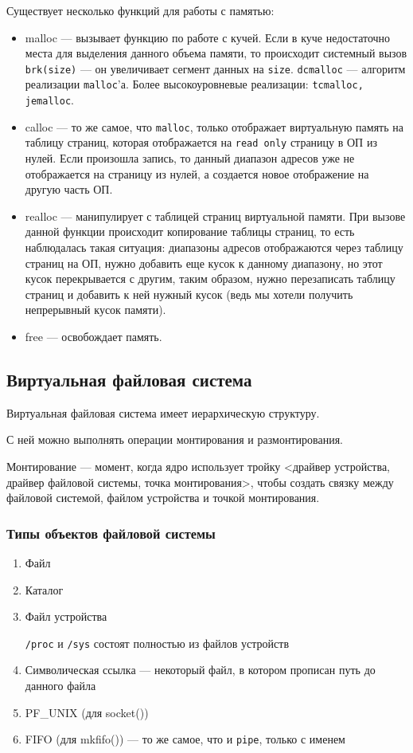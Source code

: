 Существует несколько функций для работы с памятью:
\begin{itemize}
\item malloc --- вызывает функцию по работе с кучей. Если в куче недостаточно места для выделения данного объема памяти, то происходит системный вызов \verb!brk(size)! --- он увеличивает сегмент данных на \verb!size!. \verb!dcmalloc! --- алгоритм реализации \verb!malloc!'а. Более высокоуровневые реализации: \verb!tcmalloc, jemalloc!.
\item calloc --- то же самое, что \verb!malloc!, только отображает виртуальную память на таблицу страниц, которая отображается на \verb!read only! страницу в ОП из нулей. Если произошла запись, то данный диапазон адресов уже не отображается на страницу из нулей, а создается новое отображение на другую часть ОП.
\item realloc --- манипулирует с таблицей страниц виртуальной памяти. При вызове данной функции происходит копирование таблицы страниц, то есть наблюдалась такая ситуация: диапазоны адресов отображаются через таблицу страниц на ОП, нужно добавить еще кусок к данному диапазону, но этот кусок перекрывается с другим, таким образом, нужно перезаписать таблицу страниц и добавить к ней нужный кусок (ведь мы хотели получить непрерывный кусок памяти).
\item free --- освобождает память.
\end{itemize}

\subsection*{Виртуальная файловая система}

Виртуальная файловая система имеет иерархическую структуру.

С ней можно выполнять операции монтирования и размонтирования.

Монтирование --- момент, когда ядро использует тройку <драйвер устройства, драйвер файловой системы, точка монтирования>, чтобы создать связку между файловой системой, файлом устройства и точкой монтирования.

\subsubsection*{Типы объектов файловой системы}
\begin{enumerate}
\item Файл
\item Каталог
\item Файл устройства

\verb!/proc! и \verb!/sys! состоят полностью из файлов устройств
\item Символическая ссылка --- некоторый файл, в котором прописан путь до данного файла
\item PF\_UNIX (для socket())
\item FIFO (для mkfifo()) --- то же самое, что и \verb!pipe!, только с именем
\end{enumerate}

